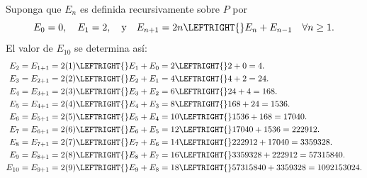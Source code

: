 \begin{solution}
	Suponga que $E_{n}$ es definida recursivamente sobre $P$ por \[ E_{0}=0,\quad E_{1}=2,\quad\text{y}\quad E_{n+1}=2n \LEFTRIGHT\{\}{E_{n}+E_{n-1}}\quad\forall n\geq1. \]
	El valor de $E_{10}$ se determina así:
	\begin{align*}
	E_{2}&=E_{1+1}=2(1)\LEFTRIGHT\{\}{E_{1}+E_{0}}=2\LEFTRIGHT\{\}{2+0}=4.\\
	E_{3}&=E_{2+1}=2(2)\LEFTRIGHT\{\}{E_{2}+E_{1}}=4\LEFTRIGHT\{\}{4+2}=24.\\
	E_{4}&=E_{3+1}=2(3)\LEFTRIGHT\{\}{E_{3}+E_{2}}=6\LEFTRIGHT\{\}{24+4}=168.\\
	E_{5}&=E_{4+1}=2(4)\LEFTRIGHT\{\}{E_{4}+E_{3}}=8\LEFTRIGHT\{\}{168+24}=1536.\\
	E_{6}&=E_{5+1}=2(5)\LEFTRIGHT\{\}{E_{5}+E_{4}}=10\LEFTRIGHT\{\}{1536+168}=17040.\\
	E_{7}&=E_{6+1}=2(6)\LEFTRIGHT\{\}{E_{6}+E_{5}}=12\LEFTRIGHT\{\}{17040+1536}=222912.\\
	E_{8}&=E_{7+1}=2(7)\LEFTRIGHT\{\}{E_{7}+E_{6}}=14\LEFTRIGHT\{\}{222912+17040}=3359328.\\
	E_{9}&=E_{8+1}=2(8)\LEFTRIGHT\{\}{E_{8}+E_{7}}=16\LEFTRIGHT\{\}{3359328+222912}=57315840.\\
	E_{10}&=E_{9+1}=2(9)\LEFTRIGHT\{\}{E_{9}+E_{8}}=18\LEFTRIGHT\{\}{57315840+3359328}=1092153024.
	\end{align*}
\end{solution}

%
%	


